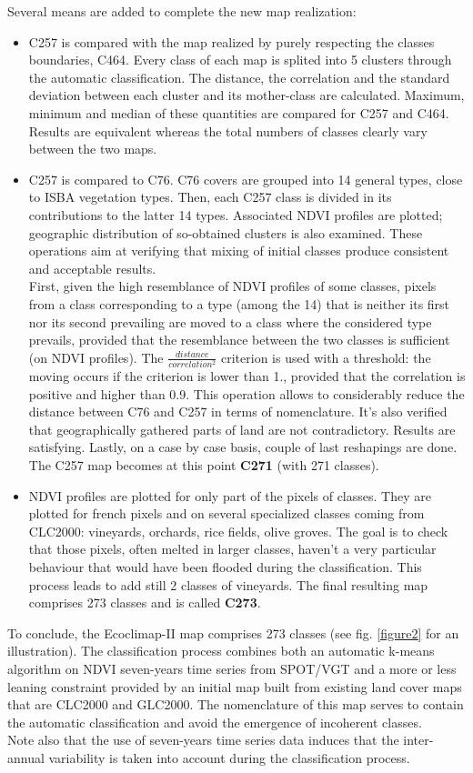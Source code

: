 Several means are added to complete the new map realization:
\begin{itemize}
\item{C257 is compared with the map realized by purely respecting the classes boundaries, C464. 
Every class of each map is splited into 5 clusters through the automatic classification. The distance, the correlation and the standard 
deviation between each cluster and its mother-class are calculated. Maximum, minimum and median of these quantities are compared for C257 and 
C464. Results are equivalent whereas the total numbers of classes clearly vary between the two maps.}
\item{C257 is compared to C76. C76 covers are grouped into 14 general types, close to ISBA vegetation types. Then, each C257 class is divided 
in its contributions to the latter 14 types. Associated NDVI profiles are plotted; geographic distribution of so-obtained clusters is also 
examined. These operations aim at verifying that mixing of initial classes produce consistent and acceptable results. \\
First, given the high resemblance of NDVI profiles of some classes, pixels from a class corresponding to a type (among the 14) that is neither 
its first nor its second prevailing are moved to a class where the considered type prevails, provided that the resemblance between the two classes 
is sufficient (on NDVI profiles). The $\frac{distance}{correlation^{2}}$ criterion is used with a threshold: the moving occurs if the criterion 
is lower than 1., provided that the correlation is positive and higher than 0.9. This operation allows to considerably reduce the distance 
between C76 and C257 in terms of nomenclature. It's also verified that geographically gathered parts of land are not contradictory. Results 
are satisfying. Lastly, on a case by case basis, couple of last reshapings are done. The C257 map becomes at this point \textbf{C271} (with 271 classes). }
\item{NDVI profiles are plotted for only part of the pixels of classes. They are plotted for french pixels and on several specialized classes 
coming from CLC2000: vineyards, orchards, rice fields, olive groves. The goal is to check that those pixels, often melted in larger classes, 
haven't a very particular behaviour that would have been flooded during the classification. This process leads to add still 2 classes of 
vineyards. The final resulting map comprises 273 classes and is called \textbf{C273}. }
\end{itemize}
To conclude, the Ecoclimap-II map comprises 273 classes (see fig. \ref{figure2} for an illustration).  
The classification process combines both an automatic k-means algorithm on NDVI 
seven-years time series from SPOT/VGT and a more or less leaning constraint provided by an initial map built from existing land cover maps 
that are CLC2000 and GLC2000. The nomenclature of this map serves to contain the automatic classification and avoid the emergence of 
incoherent classes. \\
Note also that the use of seven-years time series data induces that the inter-annual variability is taken into account 
during the classification process. 


